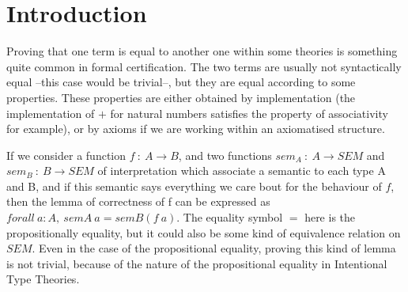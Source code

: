 \section{Introduction}

Proving that one term is equal to another one within some theories is something quite common in formal certification. The two terms are usually not syntactically equal --this case would be trivial--, but they are equal according to some properties. These properties are either obtained by implementation (the implementation of $+$ for natural numbers satisfies the property of associativity for example), or by axioms if we are working within an axiomatised structure. 

If we consider a function $f\ :\ A \rightarrow B$, and two functions $sem_A\ :\ A \rightarrow SEM$ and $sem_B\ : \ B \rightarrow SEM$ of interpretation which associate a semantic to each type A and B, and if this semantic says everything we care bout for the behaviour of $f$, then the lemma of correctness of f can be expressed as $forall\ a:A,\ semA\ a = semB (f\ a)$.
The equality symbol $=$ here is the propositionally equality, but it could also be some kind of equivalence relation on $SEM$. Even in the case of the propositional equality, proving this kind of lemma is not trivial, because of the nature of the propositional equality in Intentional Type Theories.

